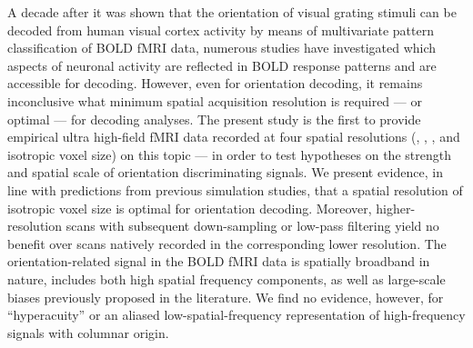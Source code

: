 
A decade after it was shown that the orientation of visual grating stimuli
can be decoded from human visual cortex activity by means of multivariate
pattern classification of BOLD fMRI data, numerous studies have investigated
which aspects of neuronal activity are reflected in BOLD response patterns
and are accessible for decoding. However, even for orientation decoding, it
remains inconclusive what minimum spatial acquisition resolution is required
--- or optimal --- for decoding analyses.
%
The present study is the first to provide empirical ultra high-field fMRI
data recorded at four spatial resolutions (, , , and
 isotropic voxel size) on this topic --- in order to test hypotheses on
the strength and spatial scale of orientation discriminating signals.
%
We present evidence, in line with predictions from previous simulation
studies, that a spatial resolution of  isotropic voxel size
is optimal for orientation decoding. Moreover, higher-resolution scans with
subsequent down-sampling or low-pass filtering yield no benefit over scans
natively recorded in the corresponding lower resolution. The
orientation-related signal in the BOLD fMRI data is spatially broadband in nature,
includes both high spatial frequency components, as well as large-scale
biases previously proposed in the literature. We find no evidence, however,
for ``hyperacuity'' or an aliased low-spatial-frequency representation of
high-frequency signals with columnar origin.

